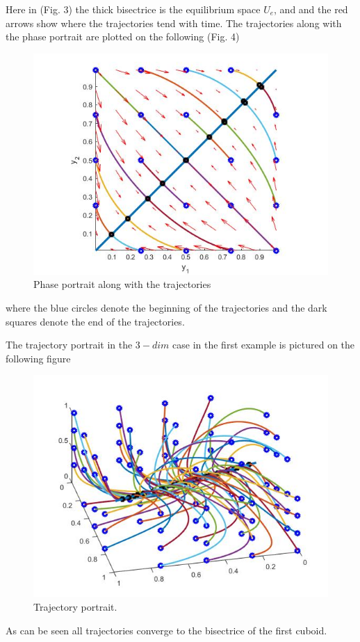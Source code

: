 \documentclass[a4paper,10pt, english]{article}
\begin{document}
Here in  (Fig. 3) the thick bisectrice is the equilibrium space $U_e$, and and the red arrows show where the trajectories tend with time.
The trajectories along with the phase portrait are plotted on the following (Fig. 4)
\begin{figure}[ht]
\label{fig_c4}
\centering
\includegraphics[scale= 0.4]{4.jpg}
\caption{Phase portrait along with the trajectories}
\end{figure}
where the blue circles denote the beginning of the trajectories and the dark squares denote the end of the trajectories.

The trajectory portrait in the $3-dim$ case in the first example is pictured on the following figure

\begin{figure}[ht]
\label{fig_c4}
\centering
\includegraphics[scale= 0.4]{5.jpg}
\caption{Trajectory portrait.}
\end{figure}

As can be seen all trajectories converge to the bisectrice of the first cuboid.
\end{document}
